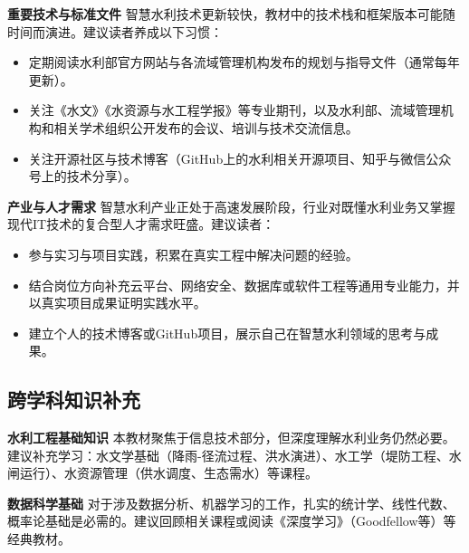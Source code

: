 \textbf{重要技术与标准文件} 智慧水利技术更新较快，教材中的技术栈和框架版本可能随时间而演进。建议读者养成以下习惯：

\begin{itemize}
\item 定期阅读水利部官方网站与各流域管理机构发布的规划与指导文件（通常每年更新）。
\item 关注《水文》《水资源与水工程学报》等专业期刊，以及水利部、流域管理机构和相关学术组织公开发布的会议、培训与技术交流信息。
\item 关注开源社区与技术博客（GitHub上的水利相关开源项目、知乎与微信公众号上的技术分享）。
\end{itemize}

\textbf{产业与人才需求} 智慧水利产业正处于高速发展阶段，行业对既懂水利业务又掌握现代IT技术的复合型人才需求旺盛。建议读者：

\begin{itemize}
\item 参与实习与项目实践，积累在真实工程中解决问题的经验。
\item 结合岗位方向补充云平台、网络安全、数据库或软件工程等通用专业能力，并以真实项目成果证明实践水平。
\item 建立个人的技术博客或GitHub项目，展示自己在智慧水利领域的思考与成果。
\end{itemize}

\subsection*{跨学科知识补充}

\textbf{水利工程基础知识} 本教材聚焦于信息技术部分，但深度理解水利业务仍然必要。建议补充学习：水文学基础（降雨-径流过程、洪水演进）、水工学（堤防工程、水闸运行）、水资源管理（供水调度、生态需水）等课程。

\textbf{数据科学基础} 对于涉及数据分析、机器学习的工作，扎实的统计学、线性代数、概率论基础是必需的。建议回顾相关课程或阅读《深度学习》（Goodfellow等）等经典教材。
